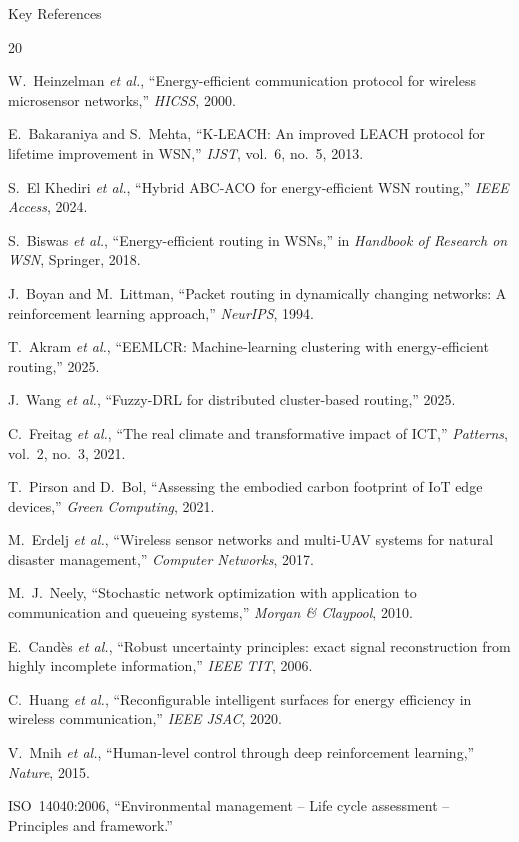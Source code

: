 \documentclass[aspectratio=169, 11pt]{beamer}
\begin{document}
\begin{frame}[allowframebreaks]{Key References}
\footnotesize
\begin{thebibliography}{20}

 W.~Heinzelman \textit{et al.}, ``Energy-efficient communication protocol for wireless microsensor networks,'' \textit{HICSS}, 2000.

 E.~Bakaraniya and S.~Mehta, ``K-LEACH: An improved LEACH protocol for lifetime improvement in WSN,'' \textit{IJST}, vol.~6, no.~5, 2013.

 S.~El Khediri \textit{et al.}, ``Hybrid ABC-ACO for energy-efficient WSN routing,'' \textit{IEEE Access}, 2024.

 S.~Biswas \textit{et al.}, ``Energy-efficient routing in WSNs,'' in \textit{Handbook of Research on WSN}, Springer, 2018.

 J.~Boyan and M.~Littman, ``Packet routing in dynamically changing networks: A reinforcement learning approach,'' \textit{NeurIPS}, 1994.

 T.~Akram \textit{et al.}, ``EEMLCR: Machine-learning clustering with energy-efficient routing,'' 2025.

 J.~Wang \textit{et al.}, ``Fuzzy-DRL for distributed cluster-based routing,'' 2025.

 C.~Freitag \textit{et al.}, ``The real climate and transformative impact of ICT,'' \textit{Patterns}, vol.~2, no.~3, 2021.

 T.~Pirson and D.~Bol, ``Assessing the embodied carbon footprint of IoT edge devices,'' \textit{Green Computing}, 2021.

 M.~Erdelj \textit{et al.}, ``Wireless sensor networks and multi-UAV systems for natural disaster management,'' \textit{Computer Networks}, 2017.

 M.~J.~Neely, ``Stochastic network optimization with application to communication and queueing systems,'' \textit{Morgan \& Claypool}, 2010.

 E.~Cand\`{e}s \textit{et al.}, ``Robust uncertainty principles: exact signal reconstruction from highly incomplete information,'' \textit{IEEE TIT}, 2006.

 C.~Huang \textit{et al.}, ``Reconfigurable intelligent surfaces for energy efficiency in wireless communication,'' \textit{IEEE JSAC}, 2020.

 V.~Mnih \textit{et al.}, ``Human-level control through deep reinforcement learning,'' \textit{Nature}, 2015.

 ISO~14040:2006, ``Environmental management -- Life cycle assessment -- Principles and framework.''

\end{thebibliography}
\end{frame}
\end{document}

